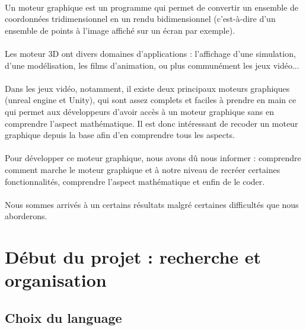 
\paragraph{}
Un moteur graphique est un programme qui permet de convertir un ensemble de coordonnées tridimensionnel en un rendu bidimensionnel (c'est-à-dire d'un ensemble de points à l'image affiché sur un écran par exemple).

\paragraph{}
Les moteur 3D ont divers domaines d'applications : l'affichage d'une simulation, d'une modélisation, les films d'animation, ou plus communément les jeux vidéo...

\paragraph{}
Dans les jeux vidéo, notamment, il existe deux principaux moteurs graphiques (unreal engine et Unity), qui sont assez complets et faciles à prendre en main ce qui permet aux développeurs d'avoir accès à un moteur graphique sans en comprendre l'aspect mathématique. Il est donc intéressant de recoder un moteur graphique depuis la base afin d'en comprendre tous les aspects.

\paragraph{}
Pour développer ce moteur graphique, nous avons dû nous informer : comprendre comment marche le moteur graphique et à notre niveau de recréer certaines fonctionnalités, comprendre l'aspect mathématique et enfin de le coder.

\paragraph{}
Nous sommes arrivés à un certains résultats malgré certaines difficultés que nous aborderons.

\newpage

\section{Début du projet : recherche et organisation}
\subsection{Choix du language}
